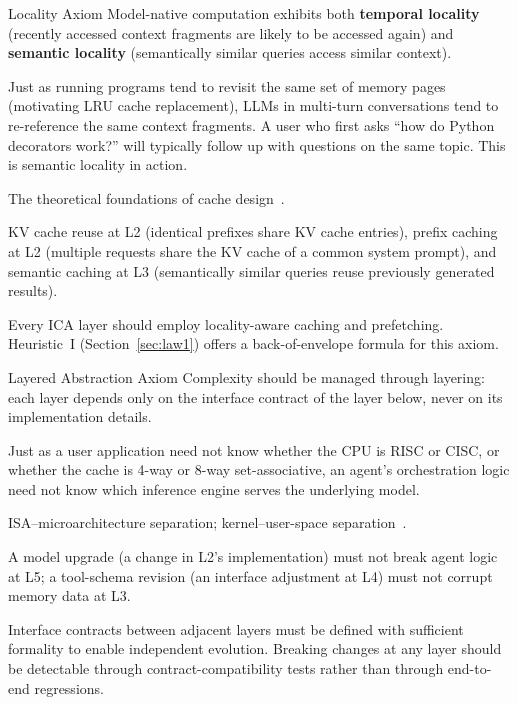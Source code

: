 

\begin{axiombox}{\theaxiom\enspace Locality Axiom}
Model-native computation exhibits both \textbf{temporal locality} (recently accessed context fragments are likely to be accessed again) and \textbf{semantic locality} (semantically similar queries access similar context).
\end{axiombox}
\begin{description}[style=nextline,leftmargin=2em,font=\bfseries]
\item[Intuition.] Just as running programs tend to revisit the same set of memory pages (motivating LRU cache replacement), LLMs in multi-turn conversations tend to re-reference the same context fragments. A user who first asks ``how do Python decorators work?'' will typically follow up with questions on the same topic. This is semantic locality in action.
\item[Classical source.] The theoretical foundations of cache design~\cite{drepper2007memory}.
\item[ICA embodiment.] KV cache reuse at L2 (identical prefixes share KV cache entries), prefix caching at L2 (multiple requests share the KV cache of a common system prompt), and semantic caching at L3 (semantically similar queries reuse previously generated results).
\item[Design implication.] Every ICA layer should employ locality-aware caching and prefetching. Heuristic~I (Section~\ref{sec:law1}) offers a back-of-envelope formula for this axiom.
\end{description}

\begin{axiombox}{\theaxiom\enspace Layered Abstraction Axiom}
Complexity should be managed through layering: each layer depends only on the interface contract of the layer below, never on its implementation details.
\end{axiombox}
\begin{description}[style=nextline,leftmargin=2em,font=\bfseries]
\item[Intuition.] Just as a user application need not know whether the CPU is RISC or CISC, or whether the cache is 4-way or 8-way set-associative, an agent's orchestration logic need not know which inference engine serves the underlying model.
\item[Classical source.] ISA--microarchitecture separation; kernel--user-space separation~\cite{hennessy2017quantitative,ostep_2023}.
\item[ICA embodiment.] A model upgrade (a change in L2's implementation) must not break agent logic at L5; a tool-schema revision (an interface adjustment at L4) must not corrupt memory data at L3.
\item[Design implication.] Interface contracts between adjacent layers must be defined with sufficient formality to enable independent evolution. Breaking changes at any layer should be detectable through contract-compatibility tests rather than through end-to-end regressions.
\end{description}

